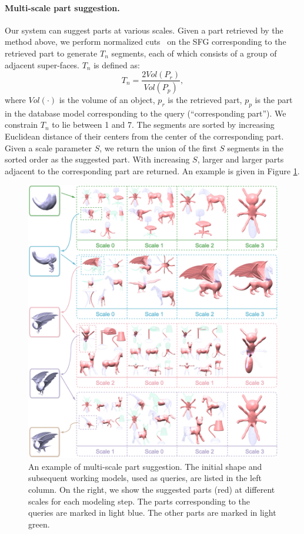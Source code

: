 \paragraph*{Multi-scale part suggestion.} Our system can suggest parts at various scales. Given a part retrieved by the method above, we perform normalized cuts~\cite{randomizedcutsfunkhousertog2008} on the SFG corresponding to the retrieved part to generate $T_n$ segments, each of which consists of a group of adjacent super-faces. $T_n$ is defined as:
\[{T_n} = \frac{{2 Vol\left( {{P_r}} \right)}}{{Vol\left( {{P_p}} \right)}},\] where $Vol\left( \cdot \right)$ is the volume of an object, $p_r$ is the retrieved part, $p_p$ is the part in the database model corresponding to the query (``corresponding part''). We constrain $T_n$ to lie between 1 and 7. The segments are sorted by increasing Euclidean distance of their centers from the center of the corresponding part. Given a scale parameter $S$, we return the union of the first $S$ segments in the sorted order as the suggested part. With increasing $S$, larger and larger parts adjacent to the corresponding part are returned. An example is given in Figure \ref{fig:MSPS}.

\begin{figure}\centering
\includegraphics[width=1.0\linewidth]{./Material/MSPS.pdf}
\caption{An example of multi-scale part suggestion. The initial shape and subsequent working models, used as queries, are listed in the left column. On the right, we show the suggested parts (red) at different scales for each modeling step. The parts corresponding to the queries are marked in light blue. The other parts are marked in light green.}\label{fig:MSPS}
\end{figure} 